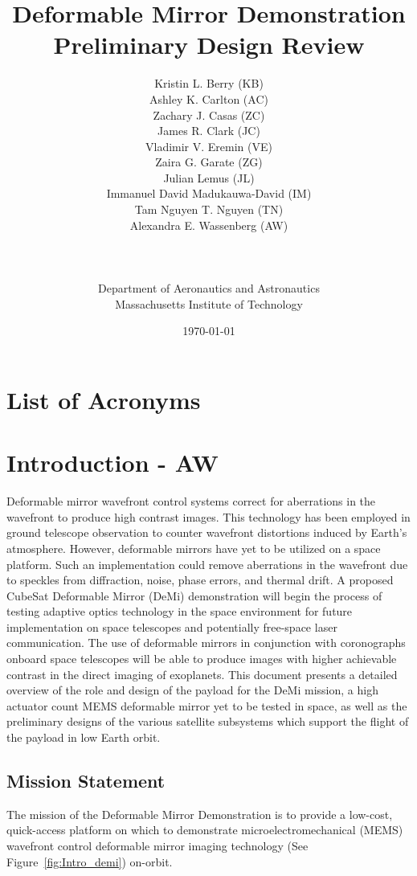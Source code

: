 \documentclass[12pt]{article}
\title{Deformable Mirror Demonstration\\Preliminary Design Review}
\author{Kristin L. Berry (KB)\\
Ashley K. Carlton (AC)\\
Zachary J. Casas (ZC)\\
James R. Clark (JC)\\
Vladimir V. Eremin (VE)\\ 
Zaira G. Garate (ZG)\\ 
Julian Lemus (JL)\\
Immanuel David Madukauwa-David (IM)\\
Tam Nguyen T. Nguyen (TN)\\
Alexandra E. Wassenberg (AW)\\\\\\\\
Department of Aeronautics and Astronautics\\
Massachusetts Institute of Technology\\
}
\date{\today}
\begin{document}
\maketitle
\newpage

\tableofcontents
\listoffigures
\listoftables


\section*{List of Acronyms}
\begin{acronym}


\end{acronym}
\newpage

\section{Introduction - AW}
Deformable mirror wavefront control systems correct for aberrations in the wavefront to produce high contrast images.  This technology has been employed in ground telescope observation to counter wavefront distortions induced by Earth’s atmosphere.  However, deformable mirrors have yet to be utilized on a space platform.  Such an implementation could remove aberrations in the wavefront due to speckles from diffraction, noise, phase errors, and thermal drift.  A proposed CubeSat Deformable Mirror (DeMi) demonstration will begin the process of testing adaptive optics technology in the space environment for future implementation on space telescopes and potentially free-space laser communication.  The use of deformable mirrors in conjunction with coronographs onboard space telescopes will be able to produce images with higher achievable contrast in the direct imaging of exoplanets.  This document presents a detailed overview of the role and design of the payload for the DeMi mission, a high actuator count MEMS deformable mirror yet to be tested in space, as well as the preliminary designs of the various satellite subsystems which support the flight of the payload in low Earth orbit.  

\subsection{Mission Statement}
The mission of the Deformable Mirror Demonstration is to provide a low-cost, quick-access platform on which to demonstrate microelectromechanical (MEMS) wavefront control deformable mirror imaging technology (See Figure~\ref{fig:Intro_demi}) on-orbit.
\end{document}
